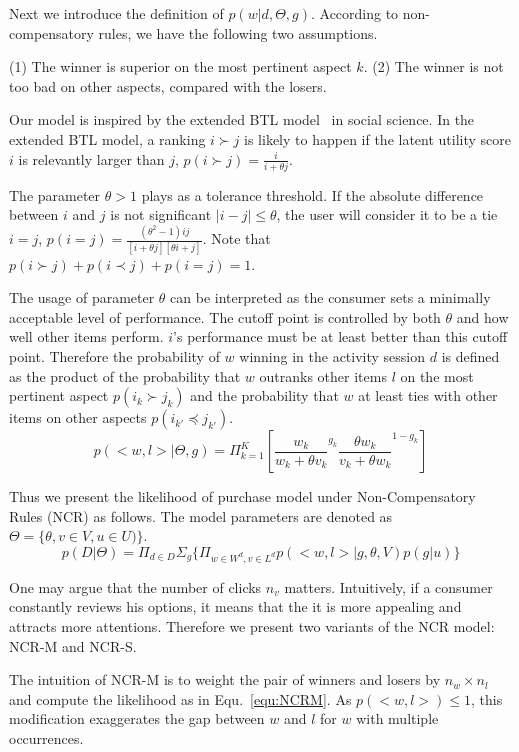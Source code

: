 \documentclass[sigconf]{acmart}
\begin{document}
Next we introduce the definition of $p(w|d,\Theta,g)$. According to non-compensatory rules, we have the following two assumptions.

(1) The winner is superior on the most pertinent aspect $k$.
(2)  The winner is not too bad on other aspects, compared with the losers. 
  
Our model is inspired by the extended BTL model~\cite{Hunter2004MM} in social science. In the extended BTL model, a ranking $i \succ j$ is likely to happen if the latent utility score $i$ is relevantly larger than $j$, $p(i \succ j)=\frac{i}{i+ \theta j}$.  
  
 The parameter $\theta>1$ plays as a tolerance threshold. If the absolute difference between $i$ and $j$ is not significant $|i-j|\leq \theta$, the user will consider it to be a tie $i=j$, $p(i = j)=\frac{(\theta^2-1)i j}{[i+\theta j][\theta i+ j]}$. Note that $p(i \succ j)+ p(i \prec j) + p(i=j) =1$. 
 
The usage of parameter $\theta$ can be interpreted as the consumer sets a minimally acceptable level of performance. The cutoff point is controlled by both $\theta$ and how well other items perform. $i$'s performance must be at least better than this cutoff point. Therefore the probability of  $w$ winning in the activity session $d$ is defined as the product of the probability that $w$ outranks other items $l$ on the most pertinent aspect $p(i_k\succ j_k)$ and the probability that $w$ at least ties with other items on other aspects $p(i_{k'} \preceq j_{k'})$.
\begin{equation}\label{equ:win}
p(<w,l>|\Theta,g)  =  \Pi_{k=1}^{K}[ {\frac{w_k}{w_k+\theta v_k}}^{g_k} { \frac{\theta w_{k}}{v_{k}+\theta w_{k}}}^{1-g_k}]
\end{equation}

Thus we present the likelihood of purchase model under Non-Compensatory Rules (NCR) as follows. The model parameters are denoted as $\Theta=\{\theta,v\in V, u\in U)\}$.     
\begin{equation}\label{equ:likelihood}
		p(D|\Theta)=\Pi_{d\in D} \Sigma_{g} \{\Pi_{w\in W^d, v\in L^d} p(<w,l>|g,\theta,V) p(g|u)\}
\end{equation}

One may argue that the number of clicks $n_v$ matters. Intuitively, if a consumer constantly reviews his options, it means that the it is more appealing and attracts more attentions. Therefore we present two variants of the NCR model: NCR-M and NCR-S.

The intuition of NCR-M is to weight the pair of winners and losers  by  $n_w \times n_l $  and compute the likelihood as in Equ.~\ref{equ:NCRM}. As $p(<w,l>) \leq 1$, this modification exaggerates the gap between $w$ and $l$ for $w$ with multiple occurrences. 
\end{document}
